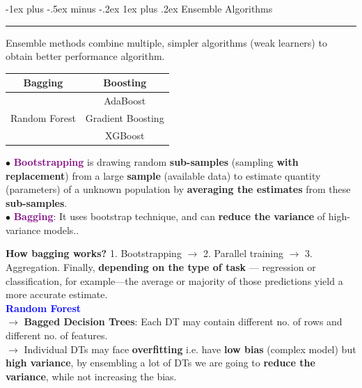 \documentclass[letterpaper, 10.5pt,landscape]{article}
\makeatletter
\renewcommand{\subsubsection}{\@startsection{subsubsection}{3}{0mm}%
                                {-1ex plus -.5ex minus -.2ex}%
                                {1ex plus .2ex}%
                                {\normalfont\small\bfseries}}
\makeatother
\begin{document}
\begin{multicols*}{3}


\subsubsection{Ensemble Algorithms} {\color{teal}\hrule height 0.5pt} \smallskip

Ensemble methods combine multiple, simpler algorithms (weak learners) to obtain better performance algorithm.

\begin{center}
        \footnotesize
        \begin{tabular}{ c|c }
           \textbf{Bagging} & \textbf{Boosting} \\
           \hline
          & AdaBoost \\
          Random Forest & Gradient Boosting \\
          & XGBoost \\
        \end{tabular}
\end{center}



$\bullet$ \textbf{\textcolor{purple}{Bootstrapping}} is drawing random \textbf{sub-samples} (sampling \textbf{with replacement}) from a large \textbf{sample} (available data) to estimate quantity (parameters) of a unknown population by \textbf{averaging the estimates} from these \textbf{sub-samples}. \\
$\bullet$ \textbf{\textcolor{purple}{Bagging}}: It uses bootstrap technique, and can \textbf{reduce the variance} of high-variance models..

\vspace{3pt}
\textbf{How bagging works?} 1. Bootstrapping $\rightarrow$ 2. Parallel training $\rightarrow$ 3. Aggregation. 
Finally, \textbf{depending on the type of task} — regression or classification, for example—the average or majority of those predictions yield a more accurate estimate.  \\






\vspace{3pt}
\textcolor{blue}{\textbf{Random Forest}} \\
$\rightarrow$\textbf{ Bagged Decision Trees}: Each DT may contain different no. of rows and different no. of features. \\
$\rightarrow$ Individual DTs may face \textbf{overfitting} i.e. have \textbf{low bias} (complex model) but \textbf{high variance}, by ensembling a lot of DTs we are going to \textbf{reduce the variance}, while not increasing the bias. \\ 


\end{multicols*}
\end{document}
